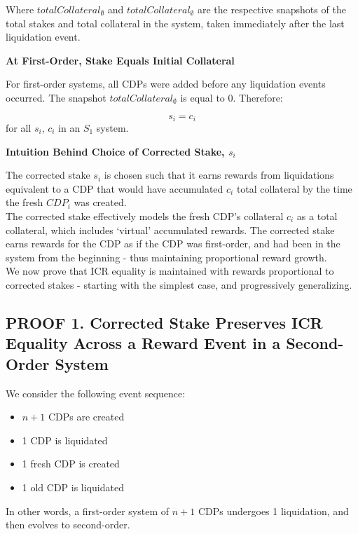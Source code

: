 \documentclass[reqno]{article}
\begin{document}
\bigskip
Where $totalCollateral_\emptyset$ and $totalCollateral_\emptyset$ are the respective snapshots of the total stakes and total collateral in the system, taken immediately after the last liquidation event.

\bigskip
\textbf{At First-Order, Stake Equals Initial Collateral}

For first-order systems, all CDPs were added before any liquidation events occurred. The snapshot $totalCollateral_\emptyset$ is equal to 0. Therefore:

\begin{equation} 
    s_i=c_i
\end{equation}
for all $s_i$, $c_i$ in an $S_1$ system.

\bigskip
\textbf{Intuition Behind Choice of Corrected Stake, $s_i$}

The corrected stake $s_i$ is chosen such that it earns rewards from liquidations equivalent to a CDP that would have accumulated $c_i$ total collateral by the time the fresh $CDP_i$ was created.\\

The corrected stake effectively models the fresh CDP’s collateral $c_i$ as a total collateral, which includes ‘virtual’ accumulated rewards. The corrected stake earns rewards for the CDP as if the CDP was first-order, and had been in the system from the beginning - thus maintaining proportional reward growth.\\

We now prove that ICR equality is maintained with rewards proportional to corrected stakes - starting with the simplest case, and progressively generalizing.

\bigskip
\subsection*{\textbf{PROOF 1. Corrected Stake Preserves ICR Equality Across a Reward Event in a Second-Order System}}

We consider the following event sequence:

\begin{itemize}
  \item $n+1$ CDPs are created
  \item 1 CDP is liquidated
  \item 1 fresh CDP is created
  \item 1 old CDP is liquidated
\end{itemize}

\bigskip
In other words, a first-order system of $n+1$ CDPs undergoes 1 liquidation, and then evolves to second-order.\\
\end{document}
